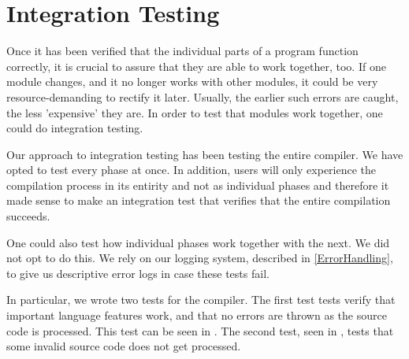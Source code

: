 \section{Integration Testing} \label{sec:IntTesting}
Once it has been verified that the individual parts of a program function correctly, it is crucial to assure that they are able to work together, too.
If one module changes, and it no longer works with other modules, it could be very resource-demanding to rectify it later.
Usually, the earlier such errors are caught, the less 'expensive' they are.
In order to test that modules work together, one could do integration testing.

Our approach to integration testing has been testing the entire compiler. We have opted to test every phase at once. In addition, users will only experience the compilation process in its entirity and not as individual phases and therefore it made sense to make an integration test that verifies that the entire compilation succeeds.

One could also test how individual phases work together with the next. We did not opt to do this. We rely on our logging system, described in \ref{ErrorHandling}, to give us descriptive error logs in case these tests fail.

In particular, we wrote two tests for the \dazel{} compiler. The first test tests verify that important language features work, and that no errors are thrown as the source code is processed. This test can be seen in . The second test, seen in , tests that some invalid source code does not get processed.

